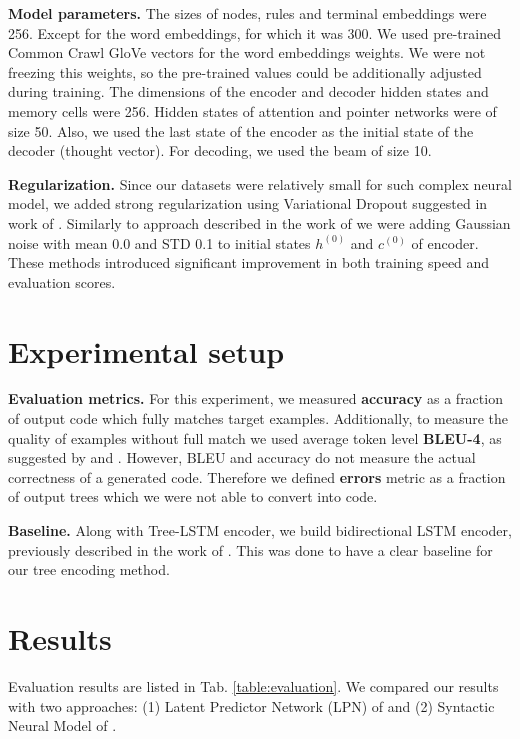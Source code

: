 \textbf{Model parameters.} The sizes of nodes, rules and terminal embeddings were 256. Except for the word embeddings, for which it was 300. We used pre-trained Common Crawl GloVe vectors \parencite{pennington2014} for the word embeddings weights. We were not freezing this weights, so the pre-trained values could be additionally adjusted during training. The dimensions of the encoder and decoder hidden states and memory cells were 256. Hidden states of attention and pointer networks were of size 50. Also, we used the last state of the encoder as the initial state of the decoder (thought vector). For decoding, we used the beam of size 10.

\textbf{Regularization.} Since our datasets were relatively small for such complex neural model, we added strong regularization using Variational Dropout suggested in work of \cite{Gal2016}. Similarly to approach described in the work of \cite{zimmermann2012} we were adding Gaussian noise with mean 0.0 and STD 0.1 to initial states $h^{(0)}$ and $c^{(0)}$ of encoder. These methods introduced significant improvement in both training speed and evaluation scores.

\section{Experimental setup} \label{exp_setup}

\textbf{Evaluation metrics.} For this experiment, we measured \textbf{accuracy} as a fraction of output code which fully matches target examples. Additionally, to measure the quality of examples without full match we used average token level \textbf{BLEU-4}, as suggested by \cite{Ling2016} and \cite{Yin2017}. However, BLEU and accuracy do not measure the actual correctness of a generated code. Therefore we defined  \textbf{errors} metric as a fraction of output trees which we were not able to convert into code.

\textbf{Baseline.} Along with Tree-LSTM encoder, we build bidirectional LSTM encoder, previously described in the work of \cite{Yin2017}. This was done to have a clear baseline for our tree encoding method. 

\section{Results}
Evaluation results are listed in Tab. \ref{table:evaluation}. We compared our results with two approaches: (1) Latent Predictor Network (LPN) of \cite{Ling2016} and (2) Syntactic Neural Model of \cite{Yin2017}. 

